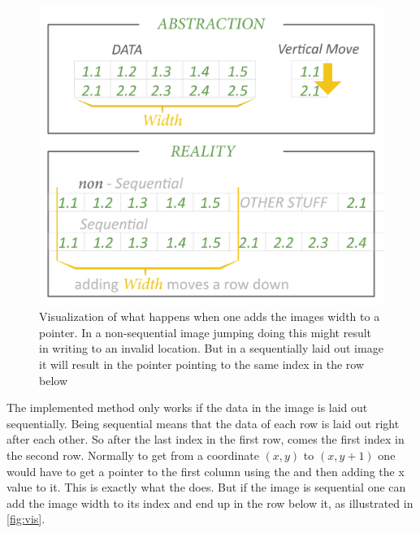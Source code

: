 \begin{figure}[H]
	\centering
	\includegraphics[width=0.6\linewidth]{figure/Analysis/data.png}
	\caption{Visualization of what happens when one adds the images width to a pointer. In a non-sequential image jumping doing this might result in writing to an invalid location. But in a sequentially laid out image it will result in the pointer pointing to the same index in the row below } 
	\label{fig:vis}
\end{figure}
 The implemented method only works if the data in the image is laid out sequentially. Being sequential means that the data of each row is laid out right after each other. So after the last index in the first row, comes the first index in the second row. Normally to get from a coordinate $(x,y)$ to $(x,y+1)$ one would have to get a pointer to the first column using the  and then adding the x value to it. This is exactly what the  does. But if the image is sequential one can add the image width to its index and end up in the row below it, as illustrated in \autoref{fig:vis}.\\
 
